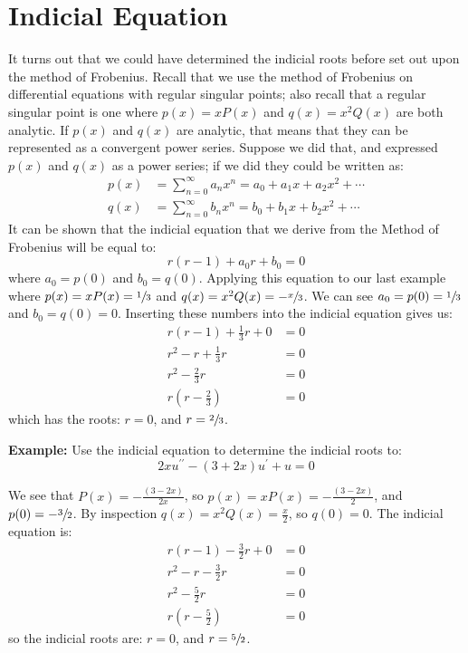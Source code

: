 \section{Indicial Equation}
It turns out that we could have determined the indicial roots before set out upon the method of Frobenius.  Recall that we use the method of Frobenius on differential equations with regular singular points; also recall that a regular singular point is one where $p(x)=xP(x)$ and $q(x)=x^2Q(x)$ are both analytic.  If $p(x)$ and $q(x)$ are analytic, that means that they can be represented as a convergent power series.  Suppose we did that, and expressed $p(x)$ and $q(x)$ as a power series; if we did they could be written as:
\begin{align*}
p(x) &= \sum\limits_{n=0}^{\infty} a_nx^n = a_0 + a_1x + a_2x^2 + \cdots \\
q(x) &= \sum\limits_{n=0}^{\infty} b_nx^n = b_0 + b_1x + b_2x^2 + \cdots
\end{align*}
It can be shown that the indicial equation that we derive from the Method of Frobenius will be equal to:
\begin{equation*}
r(r-1)+a_0r + b_0 = 0
\end{equation*}
where $a_0 = p(0)$ and $b_0 = q(0)$.  Applying this equation to our last example where $p(x)=xP(x) = \sfrac{1}{3}$ and $q(x) = x^2 Q(x) = -\sfrac{x}{3}$.  We can see $a_0 = p(0) = \sfrac{1}{3}$ and $b_0 = q(0) = 0$.  Inserting these numbers into the indicial equation gives us:
\begin{align*}
r(r-1)+\frac{1}{3}r + 0 &= 0 \\
r^2-r + \frac{1}{3}r &= 0 \\
r^2 - \frac{2}{3}r &= 0 \\
r(r-\frac{2}{3}) &=0
\end{align*}
which has the roots: $r = 0$, and $r = \sfrac{2}{3}$.

\vspace{0.5cm}

\noindent\textbf{Example:}  Use the indicial equation to determine the indicial roots to:
\begin{equation*}
2xu^{\prime \prime} - (3+2x)u^{\prime} + u = 0
\end{equation*}

\vspace{0.25cm}

\noindent We see that $P(x) = -\frac{(3 - 2x)}{2x}$, so $p(x) = xP(x) = -\frac{(3-2x)}{2}$, and $p(0) = -\sfrac{3}{2}$.  By inspection $q(x) = x^2Q(x) = \frac{x}{2}$, so $q(0) = 0$.  The indicial equation is:
\begin{align*}
r(r-1)-\frac{3}{2}r + 0 &= 0 \\
r^2-r - \frac{3}{2}r &= 0 \\
r^2 - \frac{5}{2}r &= 0 \\
r\left(r-\frac{5}{2}\right) &= 0
\end{align*}
so the indicial roots are: $r = 0$, and $r = \sfrac{5}{2}$.


